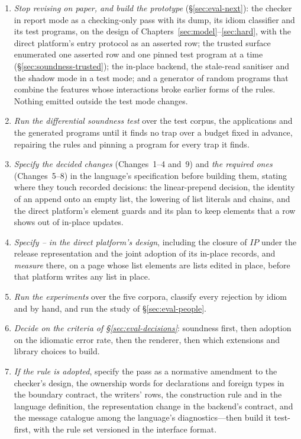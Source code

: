 \begin{enumerate}
\item \emph{Stop revising on paper, and build the prototype} (\S\ref{sec:eval-next}): the checker in
report mode as a checking-only pass with its dump, its idiom classifier and its test programs, on the
design of Chapters~\ref{sec:model}--\ref{sec:hard}, with the direct platform's entry protocol as an asserted
row; the trusted surface enumerated one asserted row and one pinned test program at a time
(\S\ref{sec:soundness-trusted}); the in-place backend, the stale-read sanitiser and the shadow mode in a test
mode; and a generator of random programs that combine the features whose interactions broke earlier forms
of the rules. Nothing emitted outside the test mode changes.
\item \emph{Run the differential soundness test} over the test corpus, the applications and the generated
programs until it finds no trap over a budget fixed in advance, repairing the rules and pinning a program
for every trap it finds.
\item \emph{Specify the decided changes} (Changes~1--4 and~9) and \emph{the required ones} (Changes~5--8) in the
language's specification before building them, stating where they touch recorded decisions: the
linear-prepend decision, the identity of an append onto an empty list, the lowering of list
literals and \code{++} chains, and the direct platform's element guards and its plan to keep elements that a
row shows out of in-place updates.
\item \emph{Specify -- in the direct platform's design}, including the closure of
$\mathit{IP}$ under the release representation and the joint adoption of its in-place records, and
\emph{measure } there, on a page whose list elements are lists edited in place, before that platform
writes any list in place.
\item \emph{Run the experiments} over the five corpora, classify every rejection by idiom and by hand, and
run the study of \S\ref{sec:eval-people}.
\item \emph{Decide on the criteria of \S\ref{sec:eval-decisions}}: soundness first, then adoption on the
idiomatic error rate, then the renderer, then which extensions and library choices to build.
\item \emph{If the rule is adopted}, specify the pass as a normative amendment to the checker's design,
the ownership words for  declarations and foreign types in the boundary contract, the
writers' rows, the construction rule and  in the language definition, the representation
change in the backend's contract, and the message catalogue among the language's diagnostics---then build
it test-first, with the rule set versioned in the interface format.
\end{enumerate}

